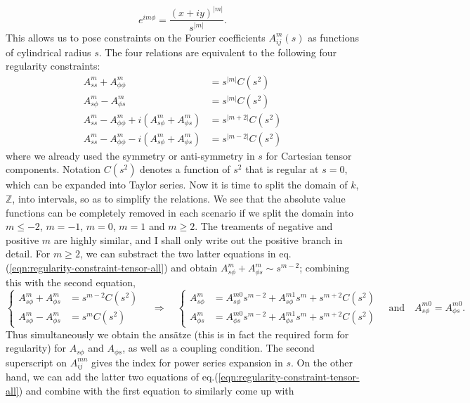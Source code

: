 \[
    e^{im\phi} = \frac{\left(x + iy\right)^{|m|}}{s^{|m|}}.
\]
This allows us to pose constraints on the Fourier coefficients $A_{ij}^m(s)$ as functions of cylindrical radius $s$. The four relations are equivalent to the following four regularity constraints:
\begin{equation}\label{eqn:regularity-constraint-tensor-all}
\begin{aligned}
    A_{ss}^m + A_{\phi\phi}^m &= s^{|m|} C(s^2) \\ 
    A_{s\phi}^m - A_{\phi s}^m &= s^{|m|} C(s^2) \\ 
    A_{ss}^m - A_{\phi\phi}^m + i \left(A_{s\phi}^m + A_{\phi s}^m\right) &= s^{|m+2|} C(s^2) \\ 
    A_{ss}^m - A_{\phi\phi}^m - i \left(A_{s\phi}^m + A_{\phi s}^m\right) &= s^{|m-2|} C(s^2)
\end{aligned}
\end{equation}
where we already used the symmetry or anti-symmetry in $s$ for Cartesian tensor components. Notation $C(s^2)$ denotes a function of $s^2$ that is regular at $s=0$, which can be expanded into Taylor series. Now it is time to split the domain of $k$, $\mathbb{Z}$, into intervals, so as to simplify the relations. We see that the absolute value functions can be completely removed in each scenario if we split the domain into $m \leq -2$, $m=-1$, $m=0$, $m=1$ and $m\geq 2$. The treaments of negative and positive $m$ are highly similar, and I shall only write out the positive branch in detail. For $m\geq 2$, we can substract the two latter equations in eq.(\ref{eqn:regularity-constraint-tensor-all}) and obtain $A_{s\phi}^m + A_{\phi s}^m \sim s^{m-2}$; combining this with the second equation,
\[
\left\{\begin{aligned}
    A_{s\phi}^m + A_{\phi s}^m &= s^{m-2} C(s^2) \\ 
    A_{s\phi}^m - A_{\phi s}^m &= s^m C(s^2)
\end{aligned}\right. \quad \Longrightarrow\quad 
\left\{\begin{aligned}
    A_{s\phi}^m &= A_{s\phi}^{m0} s^{m-2} + A_{s\phi}^{m1} s^{m} + s^{m+2} C(s^2) \\ 
    A_{\phi s}^m &= A_{\phi s}^{m0} s^{m-2} + A_{\phi s}^{m1} s^{m} + s^{m+2} C(s^2) 
\end{aligned}\right. \quad \mathrm{and} \quad A_{s\phi}^{m0} = A_{\phi s}^{m0}.
\]
Thus simultaneously we obtain the ansätze (this is in fact the required form for regularity) for $A_{s\phi}$ and $A_{\phi s}$, as well as a coupling condition. The second superscript on $A_{ij}^{mn}$ gives the index for power series expansion in $s$. On the other hand, we can add the latter two equations of eq.(\ref{eqn:regularity-constraint-tensor-all}) and combine with the first equation to similarly come up with 
